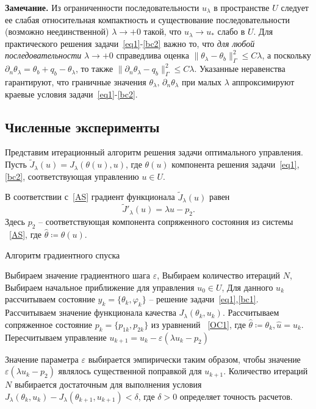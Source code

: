 \textbf{Замечание.} Из ограниченности последовательности $u_\lambda$ в пространстве $U$ следует
ее слабая относительная компактность и существование последовательности (возможно неединственной) $\lambda\to+0$ такой, что
$u_\lambda \rightarrow u_*$ слабо в $U$.
Для практического решения задачи~\eqref{eq1}-\eqref{bc2} важно то, что \textit{для любой последовательности} $\lambda\to+0$ справедлива оценка
$\|\theta_\lambda -\theta_b\|^2_\Gamma\leq C\lambda$, а поскольку $\partial_n\theta_\lambda=\theta_b+q_b-\theta_\lambda$, то также $\|\partial_n\theta_\lambda-q_b\|^2_\Gamma\leq C\lambda$.
Указанные неравенства гарантируют, что граничные значения $\theta_\lambda,\,\partial_n\theta_\lambda$
при малых $\lambda$
аппроксимируют краевые условия задачи~\eqref{eq1}-\eqref{bc2}.




\subsection{Численные эксперименты}

Представим итерационный алгоритм решения задачи оптимального управления.
Пусть $\tilde J_\lambda(u)=J_\lambda(\theta(u), u)$, где $\theta(u)$ компонента решения
задачи~\eqref{eq1},\eqref{bc2}, соответствующая управлению $u\in U$.

В соответствии с~\eqref{AS} градиент функционала $\tilde J_\lambda(u)$ равен
\[ \tilde J'_\lambda (u) = \lambda u - p_2. \]
Здесь $p_2$ -- соответствующая компонента сопряженного состояния из системы ~\eqref{AS},
где $\hat{\theta}\coloneqq\theta(u)$.

\begin{algorithm}[H]
    \caption{Алгоритм градиентного спуска}
    \label{alg:algorithm}
    \begin{algorithmic}[1]
        \State Выбираем значение градиентного шага $\varepsilon$,
        \State Выбираем количество итераций $N$,
        \State Выбираем начальное приближение для управления $u_0 \in U$,
            \State Для данного $u_k$ рассчитываем состояние $y_k = \{\theta_k, \varphi_k\}$ --
            решение задачи~\eqref{eq1},\eqref{bc1}.
            \State Рассчитываем значение функционала качества $J_\lambda(\theta_k, u_k)$.
            \State Рассчитываем сопряженное состояние $p_k=\{p_{1k},p_{2k}\}$ из уравнений ~\eqref{OC1},
            где $ \hat{\theta} \coloneqq \theta_k, \hat{u}=u_k$.
            \State Пересчитываем управление $u_{k+1} = u_k - \varepsilon (\lambda u_k - p_2)$
        \EndFor
    \end{algorithmic}
\end{algorithm}
Значение параметра $\varepsilon$ выбирается эмпирически таким образом, чтобы значение
$\varepsilon (\lambda u_k - p_2)$ являлось существенной поправкой для $u_{k+1}$.
Количество итераций $N$ выбирается достаточным для выполнения условия
$J_\lambda(\theta_k, u_k) - J_\lambda(\theta_{k+1}, u_{k+1}) < \delta$, где $\delta>0$
определяет точность расчетов.

